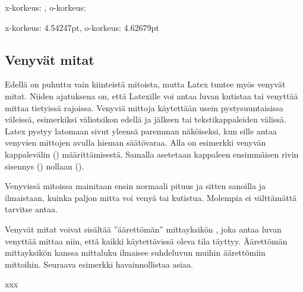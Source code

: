 \pagebreak[3]

\begin{koodilohkosis}
  \newlength{\korkeusx} \newlength{\korkeuso}
  x-korkeus: \the\korkeusx, o-korkeus: \the\korkeuso
\end{koodilohkosis}

\begin{tulossis}
  x-korkeus: 4.54247pt, o-korkeus: 4.62679pt
\end{tulossis}

\subsection{Venyvät mitat}

Edellä on puhuttu vain kiinteistä mitoista, mutta Latex tuntee myös
venyvät mitat. Niiden ajatuksena on, että Latexille voi antaa luvan
kutistaa tai venyttää mittaa tietyissä rajoissa. Venyviä mittoja
käytettään usein pystysuuntaisissa väleissä, esimerkiksi väliotsikon
edellä ja jälkeen tai tekstikappaleiden välissä. Latex pystyy latomaan
sivut yleensä paremman näköiseksi, kun sille antaa venyvien mittojen
avulla hieman säätövaraa. Alla on esimerkki venyvän kappalevälin
() määrittämisestä. Samalla asetetaan kappaleen
ensimmäisen rivin sisennys () nollaan
(\koodi{0em}).

\begin{koodilohkosis}
  \setlength{\parskip}{2ex plus 0.2ex minus 0.1ex}
  \setlength{\parindent}{0em}
\end{koodilohkosis}

Venyvissä mitoissa mainitaan ensin normaali pituus ja sitten sanoilla
 ja  ilmaistaan, kuinka paljon mitta voi venyä
tai kutistua. Molempia ei välttämättä tarvitse antaa.

Venyvät mitat voivat sisältää ''äärettömän'' mittayksikön ,
joka antaa luvan venyttää mittaa niin, että kaikki käytettävissä oleva
tila täyttyy. Äärettömän mittayksikön kanssa mittaluku ilmaisee
suhdeluvun muihin äärettömiin mittoihin. Seuraava esimerkki
havainnollistaa asiaa.

\pagebreak[3]

\begin{koodilohkosis}
  x\hspace{0mm plus 1fill}x\hspace{0mm plus 2fill}x
\end{koodilohkosis}

